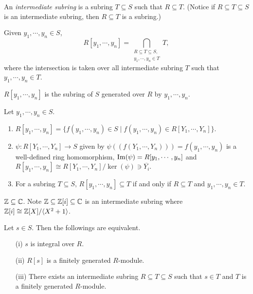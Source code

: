 \begin{definition}
    An \emph{intermediate subring} is a subring $T \subseteq S$ such that $R \subseteq T$. (Notice if $R \subseteq T \subseteq S$ is an intermediate subring, then $R \subseteq T$ is a subring.) \par
    Given $y_1,\cdots,y_n \in S$,
    \[R[y_1,\cdots,y_n] = \bigcap_{\substack{R \subseteq T \subseteq S, \\ y_1,\cdots,y_n \in T}}T,\]
    where the intersection is taken over all intermediate subring $T$ such that $y_1,\cdots,y_n \in T$. \par
    $R[y_1,\cdots,y_n]$ is the subring of $S$ generated over $R$ by $y_1,\cdots,y_n$.
\end{definition}

\begin{fact}
    Let $y_1,\cdots,y_n \in S$.
    \begin{enumerate}
        \item $R[y_1,\cdots,y_n] = \{f(y_1,\cdots,y_n) \in S \mid f(y_1,\cdots,y_n) \in R[Y_1,\cdots,Y_n]\}$.
        \item $\psi: R[Y_1,\cdots,Y_n] \to S$ given by $\psi((f(Y_1,\cdots,Y_n))) = f(y_1,\cdots,y_n)$ is a well-defined ring homomorphism, $\operatorname{Im}(\psi) = R[y_1,\cdots,y_n]$ and $R[y_1,\cdots,y_n] \cong R[Y_1,\cdots,Y_n]/\ker(\psi) \ni \overbar{Y_i}$. 
        \item For a subring $T \subseteq S$, $R[y_1,\cdots,y_n] \subseteq T$ if and only if $R \subseteq T$ and $y_1,\cdots,y_n \in T$.
    \end{enumerate}
\end{fact}

\begin{example}
    $\mathbb{Z} \subseteq \mathbb{C}$. Note $\mathbb{Z} \subseteq \mathbb{Z}[i] \subseteq \mathbb{C}$ is an intermediate subring where $\mathbb{Z}[i] \cong \mathbb{Z}[X]/\langle X^{2}+1 \rangle$.
\end{example}

\begin{proposition}
    Let $s \in S$. Then the followings are equivalent. 
    \begin{enumerate}
        \item[(i)] $s$ is integral over $R$.
        \item[(ii)] $R[s]$ is a finitely generated $R$-module.
        \item[(iii)] There exists an intermediate subring $R \subseteq T \subseteq S$ such that $s \in T$ and $T$ is a finitely generated $R$-module.
    \end{enumerate}
\end{proposition}

